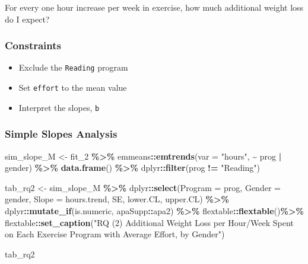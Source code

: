 \documentclass[
]{article}
\newenvironment{Shaded}{\begin{snugshade}}{\end{snugshade}}
\newcommand{\AttributeTok}[1]{\textcolor[rgb]{0.13,0.29,0.53}{#1}}
\newcommand{\FunctionTok}[1]{\textcolor[rgb]{0.13,0.29,0.53}{\textbf{#1}}}
\newcommand{\NormalTok}[1]{#1}
\newcommand{\OtherTok}[1]{\textcolor[rgb]{0.56,0.35,0.01}{#1}}
\newcommand{\SpecialCharTok}[1]{\textcolor[rgb]{0.81,0.36,0.00}{\textbf{#1}}}
\newcommand{\StringTok}[1]{\textcolor[rgb]{0.31,0.60,0.02}{#1}}
\providecommand{\tightlist}{%
  \setlength{\itemsep}{0pt}\setlength{\parskip}{0pt}}
\begin{document}
For every one hour increase per week in exercise, how much additional
weight loss do I expect?

\hypertarget{constraints-1}{%
\subsubsection{Constraints}\label{constraints-1}}

\begin{itemize}
\tightlist
\item
  Exclude the \texttt{Reading} program
\item
  Set \texttt{effort} to the mean value
\item
  Interpret the slopes, \texttt{b}
\end{itemize}

\hypertarget{simple-slopes-analysis-1}{%
\subsubsection{Simple Slopes Analysis}\label{simple-slopes-analysis-1}}

\begin{Shaded}
\begin{Highlighting}[]
\NormalTok{sim\_slope\_M }\OtherTok{\textless{}{-}}\NormalTok{ fit\_2 }\SpecialCharTok{\%\textgreater{}\%} 
\NormalTok{  emmeans}\SpecialCharTok{::}\FunctionTok{emtrends}\NormalTok{(}\AttributeTok{var =} \StringTok{"hours"}\NormalTok{, }
                    \SpecialCharTok{\textasciitilde{}}\NormalTok{ prog }\SpecialCharTok{|}\NormalTok{ gender) }\SpecialCharTok{\%\textgreater{}\%} 
  \FunctionTok{data.frame}\NormalTok{() }\SpecialCharTok{\%\textgreater{}\%} 
\NormalTok{  dplyr}\SpecialCharTok{::}\FunctionTok{filter}\NormalTok{(prog }\SpecialCharTok{!=} \StringTok{"Reading"}\NormalTok{) }
\end{Highlighting}
\end{Shaded}

\begin{Shaded}
\begin{Highlighting}[]
\NormalTok{tab\_rq2 }\OtherTok{\textless{}{-}}\NormalTok{ sim\_slope\_M }\SpecialCharTok{\%\textgreater{}\%} 
\NormalTok{  dplyr}\SpecialCharTok{::}\FunctionTok{select}\NormalTok{(}\AttributeTok{Program =}\NormalTok{ prog,}
                \AttributeTok{Gender =}\NormalTok{ gender,}
                \AttributeTok{Slope =}\NormalTok{ hours.trend,}
\NormalTok{                SE, lower.CL, upper.CL) }\SpecialCharTok{\%\textgreater{}\%} 
\NormalTok{  dplyr}\SpecialCharTok{::}\FunctionTok{mutate\_if}\NormalTok{(is.numeric, apaSupp}\SpecialCharTok{::}\NormalTok{apa2) }\SpecialCharTok{\%\textgreater{}\%} 
\NormalTok{  flextable}\SpecialCharTok{::}\FunctionTok{flextable}\NormalTok{()}\SpecialCharTok{\%\textgreater{}\%} 
\NormalTok{  flextable}\SpecialCharTok{::}\FunctionTok{set\_caption}\NormalTok{(}\StringTok{"RQ (2) Additional Weight Loss per Hour/Week Spent on Each Exercise Program with Average Effort, by Gender"}\NormalTok{)}

\NormalTok{tab\_rq2}
\end{Highlighting}
\end{Shaded}
\end{document}
